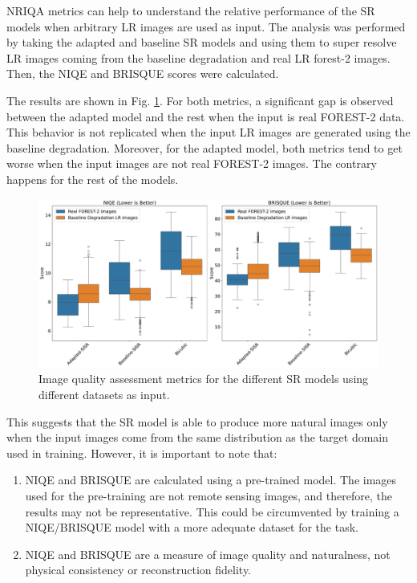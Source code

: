     NRIQA metrics can help to understand the relative performance of the SR models when arbitrary LR images are used as input. The analysis was performed by taking the adapted and baseline SR models and using them to super resolve LR images coming from the baseline degradation and real LR forest-2 images.
    Then, the NIQE and BRISQUE scores were calculated.
    
    The results are shown in Fig. \ref{fig:5-target-iqa-results}.
    For both metrics, a significant gap is observed between the adapted model and the rest when the input is real FOREST-2 data.
    This behavior is not replicated when the input LR images are generated using the baseline degradation. Moreover, for the adapted model, both metrics tend to get worse when the input images are not real FOREST-2 images. The contrary happens for the rest of the models.

    \begin{figure}[H]
        \centering
        \includegraphics[scale=0.25]{Includes/5-target-iqa-results.pdf}
        \caption{Image quality assessment metrics for the different SR models using different datasets as input. }
        \label{fig:5-target-iqa-results}
    \end{figure}

    
    This suggests that the SR model is able to produce more natural images only when the input images come from the same distribution as the target domain used in training. However, it is important to note that: 

    


    \begin{enumerate}
        \item NIQE and BRISQUE are calculated using a pre-trained model. The images used for the pre-training are not remote sensing images, and therefore, the results may not be representative. This could be circumvented by training a NIQE/BRISQUE model with a more adequate dataset for the task.
        \item NIQE and BRISQUE are a measure of image quality and naturalness, not physical consistency or reconstruction fidelity.
    \end{enumerate}

